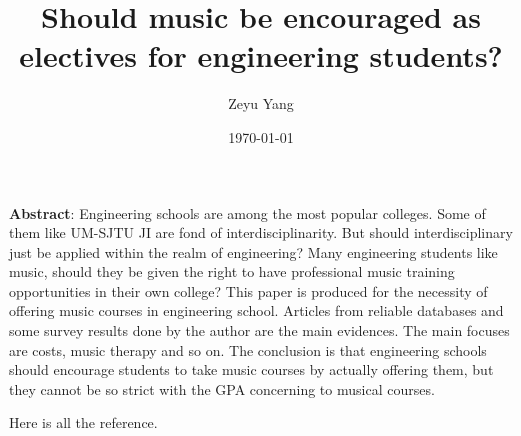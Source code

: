 \documentclass[titlepage,a4paper,12pt]{article}
\begin{document}
    \title{Should music be encouraged as electives for engineering students?}
    \author{Zeyu Yang}
    \date{\today}
    \maketitle
    \tableofcontents
    \listoffigures
    
    \textbf{Abstract}: Engineering schools are among the most popular colleges. Some of them like UM-SJTU JI are fond of interdisciplinarity. But should interdisciplinary just be applied within the realm of 
engineering? Many engineering students like music, should they be given the right to have professional 
music training opportunities in their own college? This paper is produced for the necessity of offering 
music courses in engineering school. Articles from reliable databases and some survey results done by the 
author are the main evidences. The main focuses are costs, music therapy and so on. The conclusion is
that engineering schools should encourage students to take music courses by actually offering them, but
they cannot be so strict with the GPA concerning to musical courses.
    
    
    
    
    
    



    \begin{appendix}
        Here is all the reference.
    \end{appendix}
\end{document}
